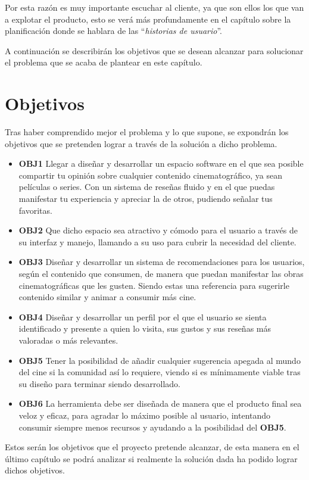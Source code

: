 Por esta razón es muy importante escuchar al cliente, ya que son ellos los que van a explotar el producto, esto se verá más profundamente en el capítulo sobre la planificación donde se hablara de las ``\textit{historias de usuario}''.

A continuación se describirán los objetivos que se desean alcanzar para solucionar el problema que se acaba de plantear en este capítulo.

\section{Objetivos}

Tras haber comprendido mejor el problema y lo que supone, se expondrán los objetivos que se pretenden lograr a través de la solución a dicho problema.

\begin{itemize}
    \item \textbf{OBJ1} Llegar a diseñar y desarrollar un espacio software en el que sea posible compartir tu opinión sobre cualquier contenido cinematográfico, ya sean películas o series. Con un sistema de reseñas fluido y en el que puedas manifestar tu experiencia y apreciar la de otros, pudiendo señalar tus favoritas.
    \item \textbf{OBJ2} Que dicho espacio sea atractivo y cómodo para el usuario a través de su interfaz y manejo, llamando a su uso para cubrir la necesidad del cliente.
    \item \textbf{OBJ3} Diseñar y desarrollar un sistema de recomendaciones para los usuarios, según el contenido que consumen, de manera que puedan manifestar las obras cinematográficas que les gusten. Siendo estas una referencia para sugerirle contenido similar y animar a consumir más cine.
    \item \textbf{OBJ4} Diseñar y desarrollar un perfil por el que el usuario se sienta identificado y presente a quien lo visita, sus gustos y sus reseñas más valoradas o más relevantes.
    \item \textbf{OBJ5} Tener la posibilidad de añadir cualquier sugerencia apegada al mundo del cine si la comunidad así lo requiere, viendo si es mínimamente viable tras su diseño para terminar siendo desarrollado.
    \item \textbf{OBJ6} La herramienta debe ser diseñada de manera que el producto final sea veloz y eficaz, para agradar lo máximo posible al usuario, intentando consumir siempre menos recursos y ayudando a la posibilidad del \textbf{OBJ5}.
\end{itemize}

Estos serán los objetivos que el proyecto pretende alcanzar, de esta manera en el último capítulo se podrá analizar si realmente la solución dada ha podido lograr dichos objetivos.
